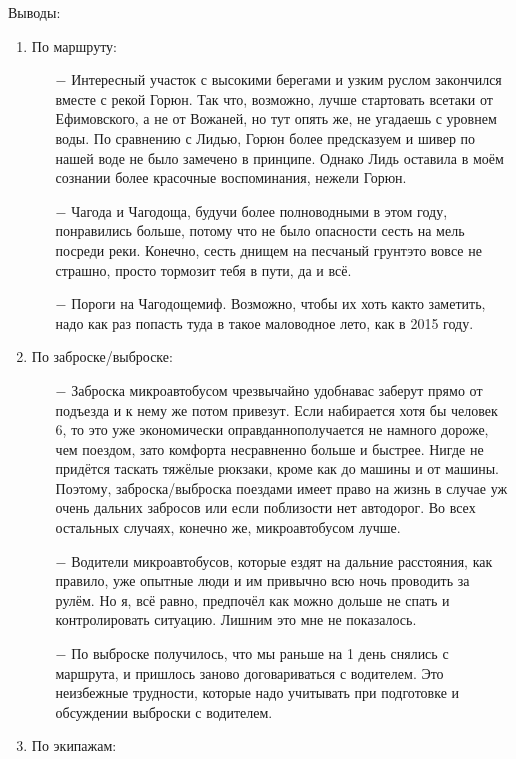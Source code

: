 Выводы:
\begin{enumerate}
\item По маршруту:
	\begin{enumerate}
	\item[$-$] Интересный участок с высокими берегами и узким руслом закончился вместе с рекой Горюн. Так что, возможно, лучше стартовать все\sdash таки от Ефимовского, а не от Вожаней, но тут опять же, не угадаешь с уровнем воды. По сравнению с Лидью, Горюн более предсказуем и шивер по нашей воде не было замечено в принципе. Однако Лидь оставила в моём сознании более красочные воспоминания, нежели Горюн.
	\item[$-$] Чагода и Чагодоща, будучи более полноводными в этом году, понравились больше, потому что не было опасности сесть на мель посреди реки. Конечно, сесть днищем на песчаный грунт\mdash это вовсе не страшно, просто тормозит тебя в пути, да и всё.
	\item[$-$] Пороги на Чагодоще\mdash миф. Возможно, чтобы их хоть как\sdash то заметить, надо как раз попасть туда в такое маловодное лето, как в 2015 году.	
	\end{enumerate}	
\item По заброске/выброске:
	\begin{enumerate}
	\item[$-$] Заброска микроавтобусом чрезвычайно удобна\mdash вас заберут прямо от подъезда и к нему же потом привезут. Если набирается хотя бы человек 6, то это уже экономически оправданно\mdash получается не намного дороже, чем поездом, зато комфорта несравненно больше и быстрее. Нигде не придётся таскать тяжёлые рюкзаки, кроме как до машины и от машины. Поэтому, заброска/выброска поездами имеет право на жизнь в случае уж очень дальних забросов или если поблизости нет автодорог. Во всех остальных случаях, конечно же, микроавтобусом лучше.
	\item[$-$] Водители микроавтобусов, которые ездят на дальние расстояния, как правило, уже опытные люди и им привычно всю ночь проводить за рулём. Но я, всё равно, предпочёл как можно дольше не спать и контролировать ситуацию. Лишним это мне не показалось.
	\item[$-$] По выброске получилось, что мы раньше на 1 день снялись с маршрута, и пришлось заново договариваться с водителем. Это неизбежные трудности, которые надо учитывать при подготовке и обсуждении выброски с водителем.
	\end{enumerate}	
\item По экипажам:
	\begin{enumerate}

\end{enumerate}
\end{enumerate}
